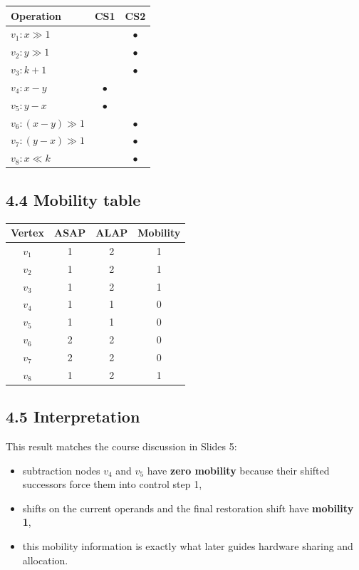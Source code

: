 \documentclass[11pt,a4paper]{article}
\begin{document}
\begin{center}
\begin{tabular}{>{\raggedright\arraybackslash}p{2.3cm}cc}
\toprule
Operation & CS1 & CS2 \\
\midrule
$v_1: x \gg 1$ & & $\bullet$ \\
$v_2: y \gg 1$ & & $\bullet$ \\
$v_3: k+1$ & & $\bullet$ \\
$v_4: x-y$ & $\bullet$ & \\
$v_5: y-x$ & $\bullet$ & \\
$v_6: (x-y)\gg 1$ & & $\bullet$ \\
$v_7: (y-x)\gg 1$ & & $\bullet$ \\
$v_8: x \ll k$ & & $\bullet$ \\
\bottomrule
\end{tabular}
\end{center}

\subsection*{4.4 Mobility table}
\begin{center}
\begin{tabular}{cccc}
\toprule
Vertex & ASAP & ALAP & Mobility \\
\midrule
$v_1$ & 1 & 2 & 1 \\
$v_2$ & 1 & 2 & 1 \\
$v_3$ & 1 & 2 & 1 \\
$v_4$ & 1 & 1 & 0 \\
$v_5$ & 1 & 1 & 0 \\
$v_6$ & 2 & 2 & 0 \\
$v_7$ & 2 & 2 & 0 \\
$v_8$ & 1 & 2 & 1 \\
\bottomrule
\end{tabular}
\end{center}

\subsection*{4.5 Interpretation}
This result matches the course discussion in Slides 5:
\begin{itemize}
  \item subtraction nodes $v_4$ and $v_5$ have \textbf{zero mobility} because their shifted successors force them into control step 1,
  \item shifts on the current operands and the final restoration shift have \textbf{mobility 1},
  \item this mobility information is exactly what later guides hardware sharing and allocation.
\end{itemize}
\end{document}

